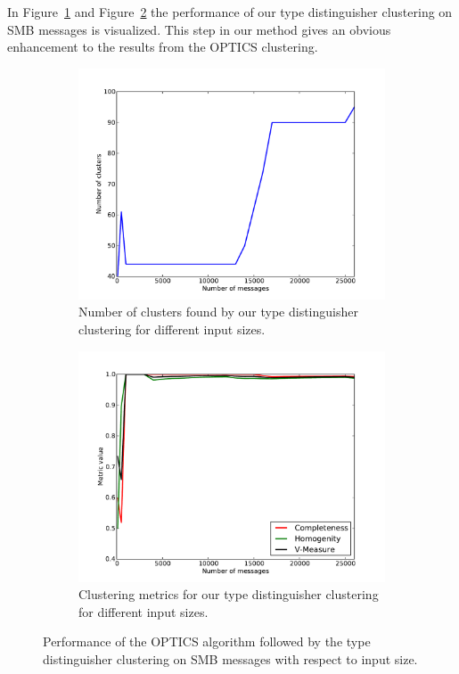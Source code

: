 \documentclass[a4paper]{report}
\begin{document}
In Figure~\ref{fig:num_td} and Figure~\ref{fig:metrics_td} the performance of
our type distinguisher clustering on SMB messages is visualized. This step in
our method gives an obvious enhancement to the results from the OPTICS
clustering.

\begin{figure}[h]
    \centering
    \begin{subfigure}[t]{0.48\textwidth}
        \includegraphics[width=\textwidth]{img/num_td}
        \caption{Number of clusters found by our type distinguisher clustering
            for different input sizes.}
        \label{fig:num_td}
    \end{subfigure}
    \quad
    \begin{subfigure}[t]{0.48\textwidth}
        \includegraphics[width=\textwidth]{img/metrics_td}
        \caption{Clustering metrics for our type distinguisher clustering for
            different input sizes.}
        \label{fig:metrics_td}
    \end{subfigure}
    \label{fig:td_res}
    \caption{Performance of the OPTICS algorithm followed by the type
        distinguisher clustering on SMB messages with respect to input size.}
\end{figure}
\end{document}
